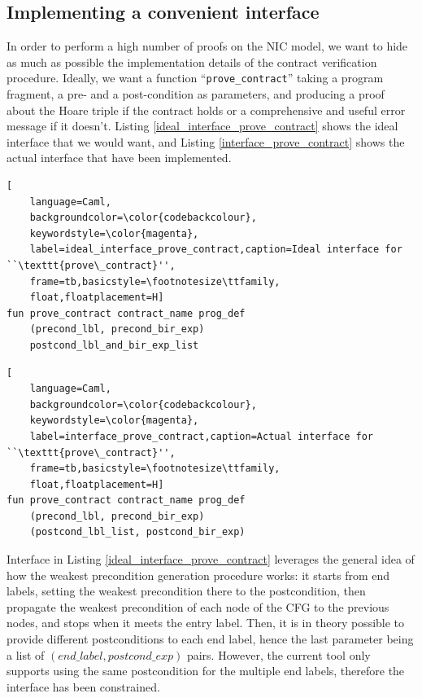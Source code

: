 \documentclass{kththesis}
\begin{document}
\subsection{Implementing a convenient interface} \label{impl_convenient_ht_interface}

In order to perform a high number of proofs on the \gls{NIC} model, we want to hide as much as possible the implementation details of the contract verification procedure. Ideally, we want a function ``\texttt{prove\_contract}'' taking a program fragment, a pre- and a post-condition as parameters, and producing a proof about the Hoare triple if the contract holds or a comprehensive and useful error message if it doesn't. Listing \ref{ideal_interface_prove_contract} shows the ideal interface that we would want, and Listing \ref{interface_prove_contract} shows the actual interface that have been implemented.

\begin{lstlisting}[
    language=Caml,
    backgroundcolor=\color{codebackcolour},
    keywordstyle=\color{magenta},
    label=ideal_interface_prove_contract,caption=Ideal interface for ``\texttt{prove\_contract}'',
    frame=tb,basicstyle=\footnotesize\ttfamily,
    float,floatplacement=H]
fun prove_contract contract_name prog_def
    (precond_lbl, precond_bir_exp)
    postcond_lbl_and_bir_exp_list
\end{lstlisting}

\begin{lstlisting}[
    language=Caml,
    backgroundcolor=\color{codebackcolour},
    keywordstyle=\color{magenta},
    label=interface_prove_contract,caption=Actual interface for ``\texttt{prove\_contract}'',
    frame=tb,basicstyle=\footnotesize\ttfamily,
    float,floatplacement=H]
fun prove_contract contract_name prog_def
    (precond_lbl, precond_bir_exp)
    (postcond_lbl_list, postcond_bir_exp)
\end{lstlisting}

Interface in Listing \ref{ideal_interface_prove_contract} leverages the general idea of how the weakest precondition generation procedure works: it starts from end labels, setting the weakest precondition there to the postcondition, then propagate the weakest precondition of each node of the \gls{CFG} to the previous nodes, and stops when it meets the entry label. Then, it is in theory possible to provide different postconditions to each end label, hence the last parameter being a list of $(end\_label, postcond\_exp)$ pairs. However, the current tool only supports using the same postcondition for the multiple end labels, therefore the interface has been constrained\footnotemark.
\end{document}
